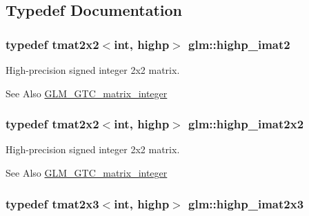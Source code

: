 \subsection{Typedef Documentation}
\hypertarget{group__gtc__matrix__integer_gae1cd6ff099593d2f215bd4ceed538200}{
\subsubsection[{highp\-\_\-imat2}]{\setlength{\rightskip}{0pt plus 5cm}typedef tmat2x2$<$int, highp$>$ {\bf glm\-::highp\-\_\-imat2}}}\label{group__gtc__matrix__integer_gae1cd6ff099593d2f215bd4ceed538200}
High-\/precision signed integer 2x2 matrix. \begin{DoxySeeAlso}{See Also}
\hyperlink{group__gtc__matrix__integer}{G\-L\-M\-\_\-\-G\-T\-C\-\_\-matrix\-\_\-integer} 
\end{DoxySeeAlso}
\hypertarget{group__gtc__matrix__integer_gab4411f2d106d24a32aaa3cb711dc8510}{
\subsubsection[{highp\-\_\-imat2x2}]{\setlength{\rightskip}{0pt plus 5cm}typedef tmat2x2$<$int, highp$>$ {\bf glm\-::highp\-\_\-imat2x2}}}\label{group__gtc__matrix__integer_gab4411f2d106d24a32aaa3cb711dc8510}
High-\/precision signed integer 2x2 matrix. \begin{DoxySeeAlso}{See Also}
\hyperlink{group__gtc__matrix__integer}{G\-L\-M\-\_\-\-G\-T\-C\-\_\-matrix\-\_\-integer} 
\end{DoxySeeAlso}
\hypertarget{group__gtc__matrix__integer_ga6c1a5f4d85de3f7eccb394970320bafc}{
\subsubsection[{highp\-\_\-imat2x3}]{\setlength{\rightskip}{0pt plus 5cm}typedef tmat2x3$<$int, highp$>$ {\bf glm\-::highp\-\_\-imat2x3}}}\label{group__gtc__matrix__integer_ga6c1a5f4d85de3f7eccb394970320bafc}
